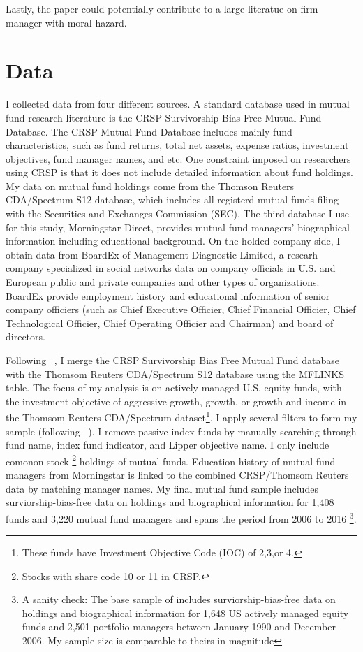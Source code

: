 \documentclass[11pt]{article}
\begin{document}
\begin{doublespace}
Lastly, the paper could potentially contribute to a large literatue on firm manager with moral hazard. 



\section{Data}
I collected data from four different sources. A standard database used in mutual fund research literature is the CRSP Survivorship Bias Free Mutual Fund Database. The CRSP Mutual Fund Database includes mainly fund characteristics, such as fund returns, total net assets, expense ratios, investment objectives, fund manager names, and etc. One constraint imposed on researchers using CRSP is that it does not include detailed information about fund holdings. 
My data on mutual fund holdings come from the Thomson Reuters CDA/Spectrum S12 database, which includes all registerd mutual funds filing with the Securities and Exchanges Commission (SEC). The third database I use for this study, Morningstar Direct, provides mutual fund managers' biographical information including educational background. On the holded company side, I obtain data from BoardEx of Management Diagnostic Limited, a researh company specialized in social networks data on company officials in U.S. and European public and private companies and other types of organizations. BoardEx provide employment history and educational information of senior company officiers (such as Chief Executive Officier, Chief Financial Officier, Chief Technological Officier, Chief Operating Officier and Chairman) and board of directors. 

Following ~\cite{wermers2000mutual}, I merge the CRSP Survivorship Bias Free Mutual Fund database with the Thomsom Reuters CDA/Spectrum S12 database using the MFLINKS table. The focus of my analysis is on actively managed U.S. equity funds, with the investment objective of aggressive growth, growth, or growth and income in the Thomsom Reuters CDA/Spectrum dataset\footnote{These funds have Investment Objective Code (IOC) of 2,3,or 4.}. 
I apply several filters to form my sample (following ~\cite{kacperczyk2006unobserved}). I remove passive index funds by manually searching through fund name, index fund indicator, and Lipper objective name. I only include comonon stock \footnote{Stocks with share code 10 or 11 in CRSP. } holdings of mutual funds. Education history of mutual fund managers from Morningstar is linked to the combined CRSP/Thomsom Reuters data by matching manager names. My final mutual fund sample includes surviorship-bias-free data on holdings and biographical information for 1,408 funds and 3,220 mutual fund managers and spans the period from 2006 to 2016 \footnote{A sanity check: The base sample of \cite{cohen2008small} includes surviorship-bias-free data on holdings and biographical information for 1,648 US actively managed equity funds and 2,501 portfolio managers between January 1990 and December 2006. My sample size is comparable to theirs in magnitude}.


\end{doublespace}
\end{document}
